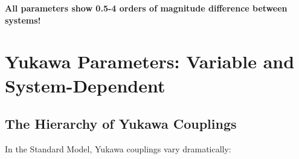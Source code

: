 	\begin{table}[htbp]
		\centering

		\caption{Systematic parameter differences between unit systems}
		\label{tab:parameter_comparison}
	\end{table}
	
	\textbf{All parameters show 0.5-4 orders of magnitude difference between systems!}
	
	\section{Yukawa Parameters: Variable and System-Dependent}
	\label{sec:yukawa_parameters}
	
	\subsection{The Hierarchy of Yukawa Couplings}
	\label{subsec:yukawa_hierarchy}
	
	In the Standard Model, Yukawa couplings vary dramatically:
	
	\begin{table}[htbp]
		\centering
		\caption{Yukawa coupling hierarchy (5 orders of magnitude variation)}
		\label{tab:yukawa_hierarchy}
	\end{table}
	
